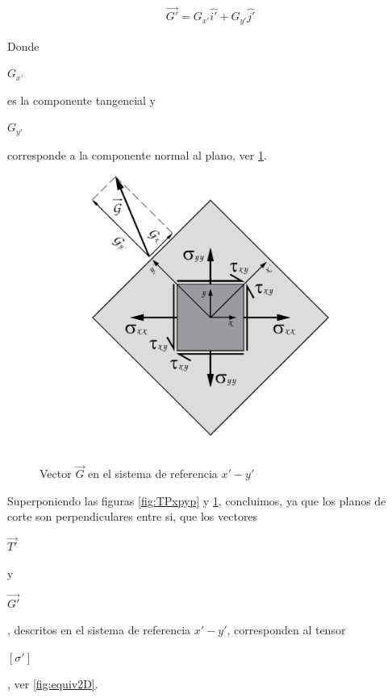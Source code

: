 \documentclass[12pt,letterpaper, twoside, openany]{article}
\begin{document}
%
\begin{large}
	\begin{align}
		\overset{\rightarrow}{G'}= G_{x'} \hat{i'} + G_{y' }\hat{j'}
		\label{eq:GPcomp}
	\end{align}
\end{large}
%
Donde \begin{large} $G_{x'}$\end{large} es la componente tangencial y \begin{large} $G_{y'}$\end{large} corresponde a la componente normal al plano, ver \cref{fig:GPxpyp}.
%
\begin{figure}[H]
	\centering
		\includegraphics[width=12 cm]{img/Proyecta_CaraYpProXpYp.pdf}
		\caption{Vector $\overset{\rightarrow}{G}$ en el sistema de referencia $x'-y'$}
		\label{fig:GPxpyp}
\end{figure}
%
Superponiendo las figuras \ref{fig:TPxpyp} y \ref{fig:GPxpyp}, concluimos, ya que los planos de corte son perpendiculares entre si, que los vectores \begin{large} $\overset{\rightarrow}{T'}$\end{large} y \begin{large} $\overset{\rightarrow}{G'}$\end{large}, descritos en el sistema de referencia $x'-y'$, corresponden al tensor \begin{large} $\left[ \sigma' \right]$\end{large}, ver \cref{fig:equiv2D}.
%
\end{document}
